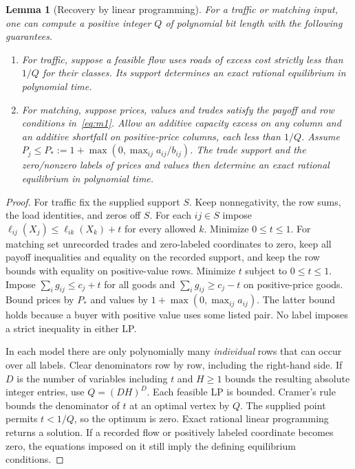 \documentclass[11pt]{article}
\newtheorem{lemma}[theorem]{Lemma}
\begin{document}
\begin{lemma}[Recovery by linear programming]\label{lem:repair}
For a traffic or matching input, one can compute a positive integer \(Q\) of polynomial bit
length with the following guarantees.
\begin{enumerate}
\item For traffic, suppose a feasible flow uses roads of excess cost strictly
less than \(1/Q\) for their classes. Its support determines an exact rational
equilibrium in polynomial time.
\item For matching, suppose prices, values and trades satisfy the payoff and
row conditions in~\eqref{eq:m1}. Allow an additive capacity excess on any
column and an additive shortfall on positive-price columns, each less than
\(1/Q\). Assume \(P_j\le P_*:=1+\max(0,\max_{ij}a_{ij}/b_{ij})\).
The trade support and the zero/nonzero labels of prices and values then
determine an exact rational equilibrium in polynomial time.
\end{enumerate}
\end{lemma}
\begin{proof}
For traffic fix the supplied support \(S\). Keep nonnegativity, the row sums,
the load identities, and zeros off \(S\). For each \(ij\in S\) impose
\(\ell_{ij}(X_j)\le\ell_{ik}(X_k)+t\) for every allowed \(k\). Minimize
\(0\le t\le1\). For matching set unrecorded trades and zero-labeled
coordinates to zero, keep all payoff inequalities and equality on the
recorded support, and keep the row bounds with equality on positive-value
rows. Minimize \(t\) subject to \(0\le t\le1\). Impose
\(\sum_i g_{ij}\le c_j+t\) for all goods and
\(\sum_i g_{ij}\ge c_j-t\) on positive-price goods. Bound prices by \(P_*\)
and values by \(1+\max(0,\max_{ij}a_{ij})\). The latter bound holds because
a buyer with positive value uses some listed pair. No label imposes a strict
inequality in either LP.

In each model there are only polynomially many \emph{individual} rows
that can occur over all labels. Clear denominators row by row, including
the right-hand side. If \(D\) is the number of variables including \(t\)
and \(H\ge1\) bounds the resulting absolute integer entries, use
\(Q=(DH)^D\). Each feasible LP is bounded. Cramer's rule bounds the
denominator of \(t\) at an optimal vertex by \(Q\). The supplied point
permits \(t<1/Q\), so the optimum is zero. Exact rational linear programming
returns a solution. If a recorded flow or positively labeled coordinate
becomes zero, the equations imposed on it still imply the defining
equilibrium conditions.
\end{proof}
\end{document}

